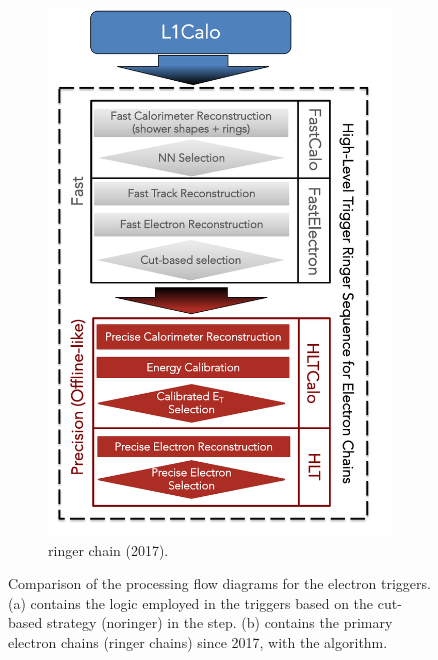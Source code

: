 \begin{figure}[h!tb]
\begin{center}
\begin{subfigure}[c]{.48\textwidth}
  \includegraphics[width=\textwidth]{sections/02_context/figures/ElectronChain_Run2_ringer.pdf}
  \caption{ringer chain (2017).}
  \end{subfigure}
  \caption{Comparison of the processing flow diagrams for the electron triggers. (a)
  contains the logic employed in the triggers based on the cut-based strategy
  (noringer) in the \fastcalo step. (b) contains the primary electron
  chains (ringer chains) since 2017, with the \rnn{} algorithm.}%
  \label{fig:ringer_chains}
  \end{center}
\end{figure}

  
